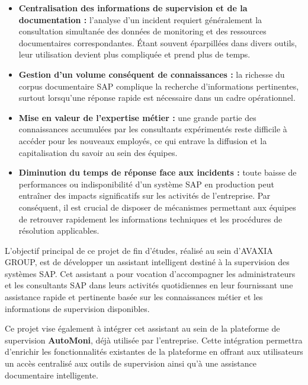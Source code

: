 \begin{itemize}[leftmargin=*, label=\textbullet]

\item \textbf{Centralisation des informations de supervision et de la documentation :} l'analyse d'un incident requiert généralement la consultation simultanée des données de monitoring et des ressources documentaires correspondantes. Étant souvent éparpillées dans divers outils, leur utilisation devient plus compliquée et prend plus de temps.
\item \textbf{Gestion d'un volume conséquent de connaissances :} la richesse du corpus documentaire SAP complique la recherche d'informations pertinentes, surtout lorsqu'une réponse rapide est nécessaire dans un cadre opérationnel.

\item \textbf{Mise en valeur de l'expertise métier :} une grande partie des connaissances accumulées par les consultants expérimentés reste difficile à accéder pour les nouveaux employés, ce qui entrave la diffusion et la capitalisation du savoir au sein des équipes.

\item \textbf{Diminution du temps de réponse face aux incidents :} toute baisse de performances ou indisponibilité d'un système SAP en production peut entraîner des impacts significatifs sur les activités de l'entreprise. Par conséquent, il est crucial de disposer de mécanismes permettant aux équipes de retrouver rapidement les informations techniques et les procédures de résolution applicables.
\end{itemize}

  





L’objectif principal de ce projet de fin d’études, réalisé au sein d’AVAXIA GROUP, est  de développer un assistant intelligent destiné à la supervision des systèmes SAP. Cet assistant a pour vocation d’accompagner les administrateurs et les consultants SAP dans leurs activités quotidiennes en leur fournissant une assistance rapide et pertinente basée sur les connaissances métier et les informations de supervision disponibles.

Ce projet vise également à intégrer cet assistant au sein de la plateforme de supervision \textbf{AutoMoni}, déjà utilisée par l’entreprise. Cette intégration permettra d’enrichir les fonctionnalités existantes de la plateforme en offrant aux utilisateurs un accès centralisé aux outils de supervision ainsi qu’à une assistance documentaire intelligente.

